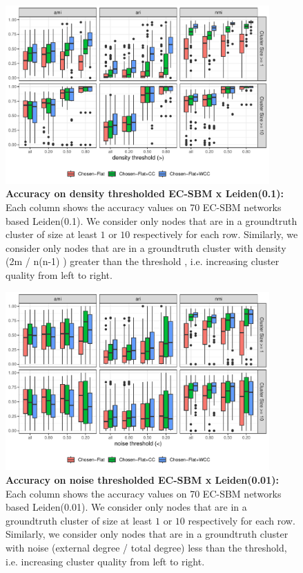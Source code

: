 \documentclass[aps,pre,superscriptaddress]{article}
\begin{document}
\begin{figure}[!htpb]
    \centering
    \includegraphics[width=0.9\textwidth]{figures/density_acc_leiden.1.pdf}
    \caption[]{\textbf{Accuracy on density thresholded EC-SBM x Leiden(0.1):} 
        Each column shows the accuracy values on 70 EC-SBM networks based Leiden(0.1). 
        We consider only nodes that are in a groundtruth cluster of size at least $1$ or $10$ respectively for each row.
        Similarly, we consider only nodes that are in a groundtruth cluster with density (2m / n(n-1) ) greater than the threshold , i.e. increasing cluster quality from left to right. }
\end{figure}

\begin{figure}[!htpb]
    \centering
    \includegraphics[width=0.9\textwidth]{figures/noise_acc_leiden.01.pdf}
    \caption[]{\textbf{Accuracy on noise thresholded EC-SBM x Leiden(0.01):} 
        Each column shows the accuracy values on 70 EC-SBM networks based Leiden(0.01). 
        We consider only nodes that are in a groundtruth cluster of size at least $1$ or $10$ respectively for each row.
        Similarly, we consider only nodes that are in a groundtruth cluster with noise (external degree / total degree) less than the threshold, i.e. increasing cluster quality from left to right. }
\end{figure}
\end{document}

